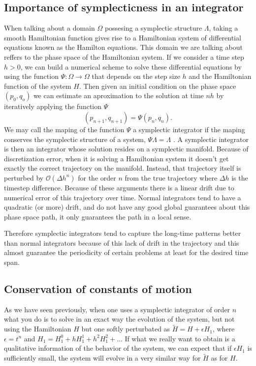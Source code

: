 \subsection{Importance of symplecticness in an integrator}
When talking about a domain $\Omega$ possesing a symplectic structure $\Lambda$, taking a smooth Hamiltonian function gives rise to a Hamiltonian system of differential equations known as the Hamilton equations. This domain we are talking about reffers to the phase space of the Hamiltonian system. If we consider a time step $h>0$, we can build a numerical scheme to solve these differential equations by using the function $\Psi :\Omega \rightarrow \Omega$ that depends on the step size $h$ and the Hamiltonian function of the system $H$. Then given an initial condition on the phase space $(p_0,q_o)$ we can estimate an aproximation to the solution at time $nh$ by iteratively applying the function $\Psi$
\begin{equation}
(p_{n+1},q_{n+1})=\Psi(p_{n},q_{n}).
\end{equation}
We may call the maping of the function $\Psi$ a symplectic integrator if the maping conserves the symplectic structure of a system, $\Psi \Lambda=\Lambda$\cite{markiewicz1999survey}\cite{de1956methods}\cite{ruth1983canonical} \cite{channell1983symplectic}.
A symplectic integrator is then an integrator whose solution resides on a symplectic manifold. Because of discretization error, when it is solving a Hamiltonian system it doesn't get exactly the correct trajectory on the manifold. Instead, that trajectory itself is perturbed by $\mathcal{O}(\Delta h^n)$ for the order $n$ from the true trajectory where $\Delta h$ is the timestep difference. Because of these arguments there is a linear drift due to numerical error of this trajectory over time. Normal integrators tend to have a quadratic (or more) drift, and do not have any good global guarantees about this phase space path, it only guarantees the path in a local sense.\par




Therefore symplectic integrators tend to capture the long-time patterns better than normal integrators because of this lack of drift in the trajectory and this almost guarantee the periodicity of certain problems at least for the desired time span. 

\subsection{Conservation of constants of motion}
As we have seen previously, when one uses a symplectic integrator of order $n$ what you do is to solve in an exact way the evolution of the system, but not using the Hamiltonian $H$ but one softly perturbated as $\tilde{H}=H+\epsilon H_1$, where $\epsilon=t^n$ and $H_1=H_1^0+hH_1^1+h^2H_1^2+...$ If what we really want to obtain is a qualitative information of the behavior of the system, we can expect that if $\epsilon H_1$ is sufficiently small, the system will evolve in a very similar way for $\tilde{H}$ as for $H$.\par

